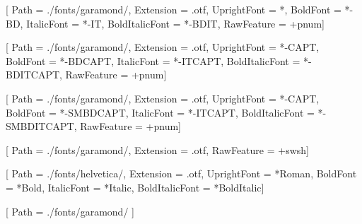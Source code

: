 \usepackage{fontspec}

\setmainfont{GARAMONDPREMRPRO}[%
    Path            = ./fonts/garamond/,
    Extension       = .otf,
    UprightFont     = *,
    BoldFont        = *-BD,
    ItalicFont      = *-IT,
    BoldItalicFont  = *-BDIT,
    RawFeature      = +pnum]

\newfontfamily{}[%
    Path            = ./fonts/garamond/,
    Extension       = .otf,
    UprightFont     = *-CAPT,
    BoldFont        = *-BDCAPT,
    ItalicFont      = *-ITCAPT,
    BoldItalicFont  = *-BDITCAPT,
    RawFeature      = +pnum]

\newfontfamily{}[%
Path            = ./fonts/garamond/,
Extension       = .otf,
UprightFont     = *-CAPT,
BoldFont        = *-SMBDCAPT,
ItalicFont      = *-ITCAPT,
BoldItalicFont  = *-SMBDITCAPT,
RawFeature      = +pnum]

\newfontface{}[%
    Path            = ./fonts/garamond/,
    Extension       = .otf,
    RawFeature      = +swsh]

\newfontfamily{}[%
    Path            = ./fonts/helvetica/,
    Extension       = .otf,
    UprightFont     = *Roman,
    BoldFont        = *Bold,
    ItalicFont      = *Italic,
    BoldItalicFont  = *BoldItalic]

\renewcommand{\sffamily}{\Helvetica}

\usepackage{selnolig}

\usepackage[math-style=TeX, bold-style=TeX]{unicode-math}

[
    Path = ./fonts/garamond/
]






